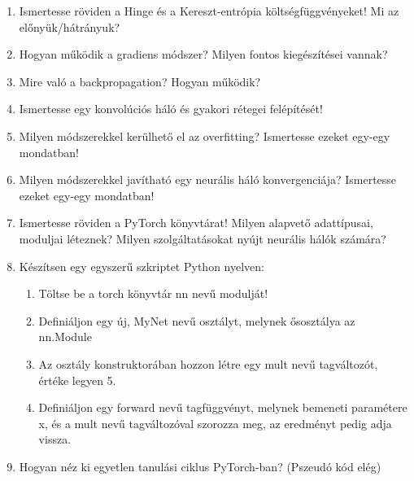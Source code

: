 \documentclass[12pt,a4paper,oneside]{report}             %
\begin{document}
\begin{enumerate}
\item Ismertesse röviden a Hinge és a Kereszt-entrópia költségfüggvényeket! Mi az előnyük/hátrányuk?
\item Hogyan működik a gradiens módszer? Milyen fontos kiegészítései vannak?
\item Mire való a backpropagation? Hogyan működik?
\item Ismertesse egy konvolúciós háló és gyakori rétegei felépítését!
\item Milyen módszerekkel kerülhető el az overfitting? Ismertesse ezeket egy-egy mondatban!
\item Milyen módszerekkel javítható egy neurális háló konvergenciája? Ismertesse ezeket egy-egy mondatban!
\item Ismertesse röviden a PyTorch könyvtárat! Milyen alapvető adattípusai, moduljai léteznek? Milyen szolgáltatásokat nyújt neurális hálók számára?
\item Készítsen egy egyszerű szkriptet Python nyelven: 
\begin{enumerate}
\item Töltse be a torch könyvtár nn nevű modulját!
\item Definiáljon egy új, MyNet nevű osztályt, melynek ősosztálya az nn.Module
\item Az osztály konstruktorában hozzon létre egy mult nevű tagváltozót, értéke legyen 5.
\item Definiáljon egy forward nevű tagfüggvényt, melynek bemeneti paramétere x, és a mult nevű tagváltozóval szorozza meg, az eredményt pedig adja vissza.
\end{enumerate}
\item Hogyan néz ki egyetlen tanulási ciklus PyTorch-ban? (Pszeudó kód elég)
\end{enumerate}


\printbibliography
\end{document}
